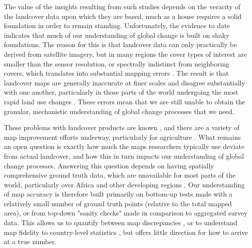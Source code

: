 \documentclass{pnastwo}
\begin{document}
\begin{article}
The value of the insights resulting from such studies depends on the veracity of the landcover data upon which they are based, much as a house requires a solid foundation in order to remain standing. Unfortunately, the evidence to date indicates that much of our understanding of global change is built on shaky foundations. The reason for this is that landcover data can only practically be derived from satellite imagery, but in many regions the cover types of interest are smaller \cite[e.g. smallholder's farms][]{jain_mapping_2013} than the sensor resolution, or spectrally indistinct from neighboring covers, which translates into substantial mapping errors \cite{see_improved_2015,lobell_use_2013,estes_diylandcover:_2015}. The result is that landcover maps are generally inaccurate at finer scales and disagree substantially with one another, particularly in those parts of the world undergoing the most rapid land use changes \cite{estes_projected_2013, fritz_comparison_2010, fritz_cropland_2011}. These errors mean that we are still unable to obtain the granular, mechanistic understanding of global change processes that we need. 

These problems with landcover products are known \cite{fritz_comparison_2010, fritz_cropland_2011, see_improved_2015, fritz_mapping_2015,verburg_challenges_2011}, and there are a variety of map improvement efforts underway, particularly for agriculture \cite{fritz_geo-wiki:_2012,estes_diylandcover:_2015}. What remains an open question is exactly how much the maps researchers typically use deviate from actual landcover, and how this in turn impacts our understanding of global change processes. Answering this question depends on having spatially comprehensive ground truth data, which are unavailable for most parts of the world, particularly over Africa and other developing regions \cite{see_improved_2015}. Our understanding of map accuracy is therefore built primarily on bottom-up tests made with a relatively small number of ground truth points (relative to the total mapped area), or from top-down "sanity checks" made in comparison to aggregated survey data. This allows us to quantify between map discrepancies  \cite[e.g.][]{fritz_comparison_2010, kaptue_tchuente_comparison_2011}, or to understand map fidelity to country-level statistics \cite[e.g.][]{fritz_comparison_2010}, but offers little direction for how to arrive at a true number.


\end{article}
\end{document}

